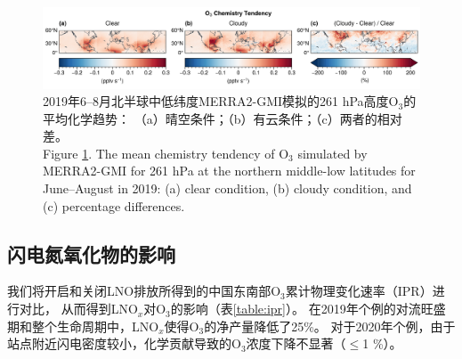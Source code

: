 \begin{figure}[H]
    \centering
    \includegraphics[width=\textwidth]{./figures/uto3_chem_tendency.png}
    \caption{
    2019年6--8月北半球中低纬度MERRA2-GMI模拟的261 hPa高度O$_3$的平均化学趋势：
    （a）晴空条件；（b）有云条件；（c）两者的相对差。\\
    Figure \ref{fig:uto3_chem_tendency}. The mean chemistry tendency of O$_3$ simulated by MERRA2-GMI for 261 hPa at the northern middle-low latitudes for June--August in 2019:
    (a) clear condition, (b) cloudy condition, and (c) percentage differences.
    }
    \label{fig:uto3_chem_tendency}
\end{figure}

\subsection{闪电氮氧化物的影响} \label{sec:lnox_effects}

我们将开启和关闭LNO排放所得到的中国东南部O$_3$累计物理变化速率（IPR）进行对比，
从而得到LNO$_x$对O$_3$的影响（表\ref{table:ipr}）。
在2019年个例的对流旺盛期和整个生命周期中，LNO$_x$使得O$_3$的净产量降低了25\%。
对于2020年个例，由于站点附近闪电密度较小，化学贡献导致的O$_3$浓度下降不显著（$\leq$1 \%）。


